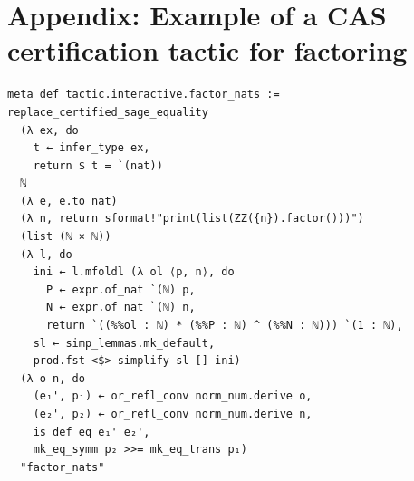 \documentclass[sigplan,10pt,nonacm,
screen]{acmart} \settopmatter{printfolios=true,printccs=false,printacmref=false}
\begin{document}
\section{Appendix: Example of a CAS certification tactic for factoring}
\label{app:factor_nats}
\begin{lstlisting}
meta def tactic.interactive.factor_nats := replace_certified_sage_equality
  (λ ex, do
    t ← infer_type ex,
    return $ t = `(nat))
  ℕ
  (λ e, e.to_nat)
  (λ n, return sformat!"print(list(ZZ({n}).factor()))")
  (list (ℕ × ℕ))
  (λ l, do
    ini ← l.mfoldl (λ ol ⟨p, n⟩, do
      P ← expr.of_nat `(ℕ) p,
      N ← expr.of_nat `(ℕ) n,
      return `((%%ol : ℕ) * (%%P : ℕ) ^ (%%N : ℕ))) `(1 : ℕ),
    sl ← simp_lemmas.mk_default,
    prod.fst <$> simplify sl [] ini)
  (λ o n, do
    (e₁', p₁) ← or_refl_conv norm_num.derive o,
    (e₂', p₂) ← or_refl_conv norm_num.derive n,
    is_def_eq e₁' e₂',
    mk_eq_symm p₂ >>= mk_eq_trans p₁)
  "factor_nats"
\end{lstlisting}




\end{document}
